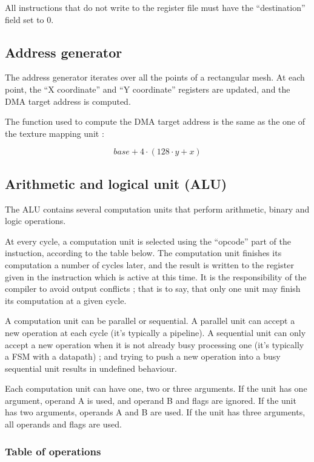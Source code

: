 \documentclass[a4paper,11pt]{article}
\begin{document}
All instructions that do not write to the register file must have the ``destination'' field set to 0.

\subsection{Address generator}
The address generator iterates over all the points of a rectangular mesh. At each point, the ``X coordinate'' and ``Y coordinate'' registers are updated, and the DMA target address is computed.

The function used to compute the DMA target address is the same as the one of the texture mapping unit :

\begin{equation*}
base + 4 \cdot (128 \cdot y + x)
\end{equation*}

\subsection{Arithmetic and logical unit (ALU)}
The ALU contains several computation units that perform arithmetic, binary and logic operations.

At every cycle, a computation unit is selected using the ``opcode'' part of the instuction, according to the table below. The computation unit finishes its computation a number of cycles later, and the result is written to the register given in the instruction which is active at this time. It is the responsibility of the compiler to avoid output conflicts ; that is to say, that only one unit may finish its computation at a given cycle.

A computation unit can be parallel or sequential. A parallel unit can accept a new operation at each cycle (it's typically a pipeline). A sequential unit can only accept a new operation when it is not already busy processing one (it's typically a FSM with a datapath) ; and trying to push a new operation into a busy sequential unit results in undefined behaviour.

Each computation unit can have one, two or three arguments. If the unit has one argument, operand A is used, and operand B and flags are ignored. If the unit has two arguments, operands A and B are used. If the unit has three arguments, all operands and flags are used.

\subsubsection{Table of operations}
\end{document}
